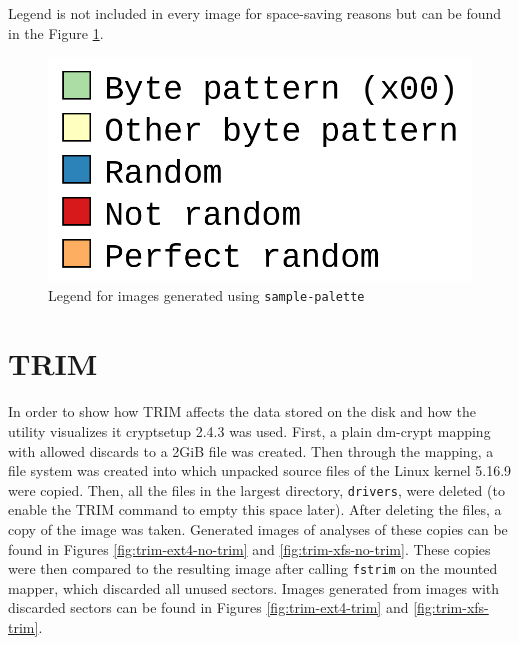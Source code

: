 \documentclass[
  digital, %
  color,   %
  oneside, %
  lof,     %
  nolot,     %
]{fithesis4}
\begin{document}

Legend is not included in every image for space-saving reasons but can be found in the Figure \ref{fig:legend}.

\begin{figure}[H]
  \includegraphics[width=.45\textwidth,interpolate=true]{legend.png}
  \caption{Legend for images generated using \texttt{sample-palette}}
  \label{fig:legend}
\end{figure}

\section{TRIM}
\label{sec:trim}

In order to show how TRIM affects the data stored on the disk and how the utility visualizes it cryptsetup 2.4.3 was used. 
First, a plain dm-crypt mapping with allowed discards to a 2GiB file was created.
Then through the mapping, a file system was created into which unpacked source files of the Linux kernel 5.16.9 were copied.
Then, all the files in the largest directory, \texttt{drivers}, were deleted (to enable the TRIM command to empty this space later).
After deleting the files, a copy of the image was taken.
Generated images of analyses of these copies can be found in Figures \ref{fig:trim-ext4-no-trim} and \ref{fig:trim-xfs-no-trim}.
These copies were then compared to the resulting image after calling \texttt{fstrim} on the mounted mapper, which discarded all unused sectors.
Images generated from images with discarded sectors can be found in Figures \ref{fig:trim-ext4-trim} and \ref{fig:trim-xfs-trim}.
\end{document}
